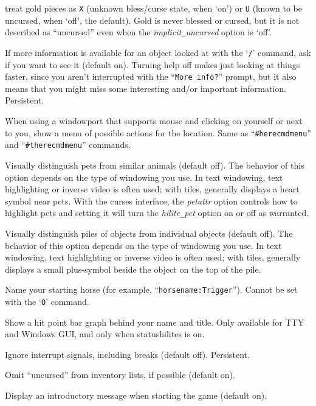 treat gold pieces as {\tt X} (unknown bless/curse state, when `on')
or {\tt U} (known to be uncursed, when `off', the default).
Gold is never blessed or cursed, but it is not described as ``uncursed''
even when the {\it implicit\verb+_+uncursed\/} option is `off'.
\item[\ib{help}]
If more information is available for an object looked at
with the `{\tt /}' command, ask if you want to see it (default on).
Turning help off makes just looking at things faster, since you aren't
interrupted with the ``{\tt More info?}'' prompt, but it also means that you
might miss some interesting and/or important information.  Persistent.
\item[\ib{herecmd\verb+_+menu}]
When using a windowport that supports mouse and clicking on yourself or
next to you, show a menu of possible actions for the location.
Same as ``{\tt \#herecmdmenu}'' and ``{\tt \#therecmdmenu}'' commands.
\item[\ib{hilite\verb+_+pet}]
Visually distinguish pets from similar animals (default off).
The behavior of this option depends on the type of windowing you use.
In text windowing, text highlighting or inverse video is often used;
with tiles, generally displays a heart symbol near pets.
With the curses interface, the {\it petattr\/}
option controls how to highlight pets and setting it will turn the
{\it hilite\verb+_+pet\/} option on or off as warranted.
\item[\ib{hilite\verb+_+pile}]
Visually distinguish piles of objects from individual objects (default off).
The behavior of this option depends on the type of windowing you use.
In text windowing, text highlighting or inverse video is often used;
with tiles, generally displays a small plus-symbol beside the object
on the top of the pile.
\item[\ib{horsename}]
Name your starting horse (for example, ``{\tt horsename:Trigger}'').
Cannot be set with the `{\tt O}' command.
\item[\ib{hitpointbar}]
Show a hit point bar graph behind your name and title.
Only available for TTY and Windows GUI, and only when statushilites is on.
\item[\ib{ignintr}]
Ignore interrupt signals, including breaks (default off).  Persistent.
\item[\ib{implicit\verb+_+uncursed}]
Omit ``uncursed'' from inventory lists, if possible (default on).
\item[\ib{legacy}]
Display an introductory message when starting the game (default on).
